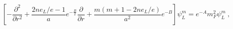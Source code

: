 \begin{equation}
\left[-\frac{\partial^2}{\partial r^2}
+\frac{2ne_L/e-1}{a}e^{-\frac{B}{2}}
\frac{\partial}{\partial r} +
\frac{m(m+1-2ne_L/e)}{a^2}e^{-B} \right] \psi_L ^m = e^{-A} m_F^2
\psi_L^m~,
\end{equation}

